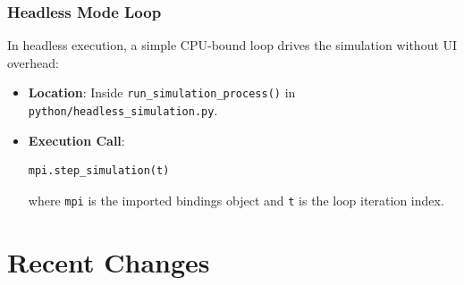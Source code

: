 \documentclass[14pt,a4paper]{extreport}
\begin{document}
\subsection{Headless Mode Loop}
In headless execution, a simple CPU-bound loop drives the simulation without UI overhead:
\begin{itemize}
    \item \textbf{Location}: Inside \texttt{run\_simulation\_process()} in \texttt{python/headless\_simulation.py}.
    \item \textbf{Execution Call}:
    \begin{lstlisting}[language=Python]
    mpi.step_simulation(t)
    \end{lstlisting}
    where \texttt{mpi} is the imported bindings object and \texttt{t} is the loop iteration index.
\end{itemize}

\chapter{Recent Changes}

\end{document}
